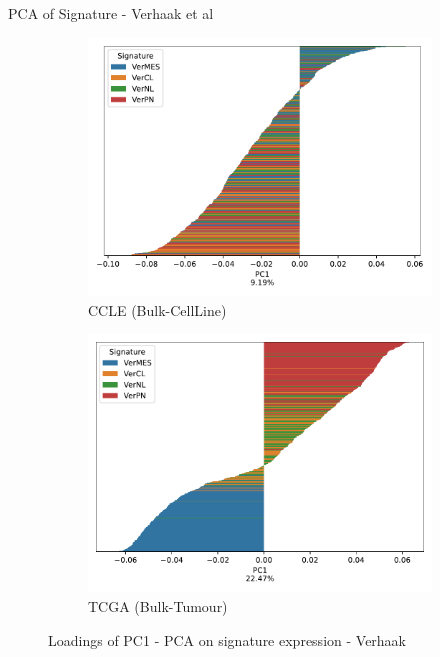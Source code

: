 \documentclass[aspectratio=169,9pt]{beamer}
\begin{document}
    \begin{frame}{PCA of Signature - Verhaak et al}
        \begin{adjustwidth}{-5cm}{-5cm}
            \centering
            \begin{figure}\ContinuedFloat
                \centering
                \begin{subfigure}[c]{0.48\textwidth}
                    \centering
                    \includegraphics[width=\textwidth]{CCLE_loadings_barplot_Ver}
                    \caption{CCLE (Bulk-CellLine)}
                \end{subfigure}
                \begin{subfigure}[c]{0.48\textwidth}
                    \centering
                    \includegraphics[width=\textwidth]{TCGA_loadings_barplot_Ver}
                    \caption{TCGA (Bulk-Tumour)}
                \end{subfigure}
                \caption{Loadings of PC1 - PCA on signature expression - Verhaak}
            \end{figure}
        \end{adjustwidth}
    \end{frame}
\end{document}

